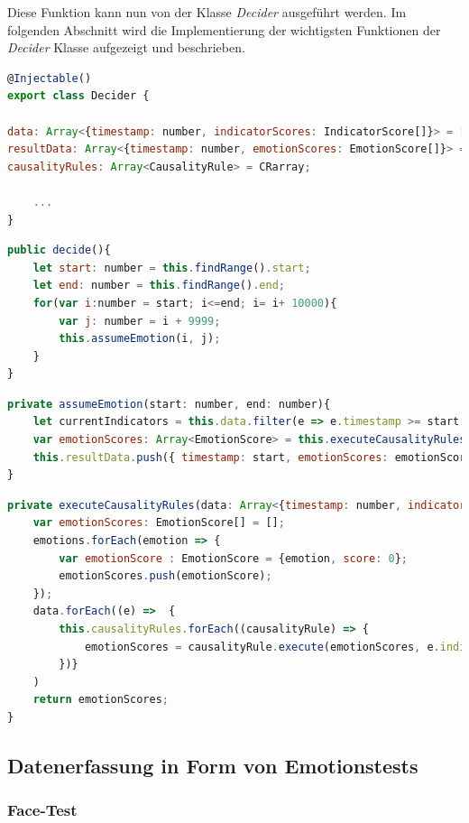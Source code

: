 Diese Funktion kann nun von der Klasse \textit{Decider} ausgeführt werden.
\newline \newline
Im folgenden Abschnitt wird die Implementierung der wichtigsten Funktionen der \textit{Decider} Klasse aufgezeigt und beschrieben. \newpage
\begin{lstlisting}[caption={Atrribute der Decider-Klasse}, language=JavaScript]
@Injectable()
export class Decider {

data: Array<{timestamp: number, indicatorScores: IndicatorScore[]}> = [];
resultData: Array<{timestamp: number, emotionScores: EmotionScore[]}> = [];
causalityRules: Array<CausalityRule> = CRarray;

	...
}
\end{lstlisting}
\begin{lstlisting}[caption={decide-Funktion der Decider-Klasse}, language=JavaScript]
public decide(){
	let start: number = this.findRange().start;
	let end: number = this.findRange().end;
	for(var i:number = start; i<=end; i= i+ 10000){
		var j: number = i + 9999;
		this.assumeEmotion(i, j);
	} 
}
\end{lstlisting}
\begin{lstlisting}[caption={assumeEmotion-Funktion der Decider-Klasse}, language=JavaScript]
private assumeEmotion(start: number, end: number){
	let currentIndicators = this.data.filter(e => e.timestamp >= start && e.timestamp <= end)
	var emotionScores: Array<EmotionScore> = this.executeCausalityRules(currentIndicators);
	this.resultData.push({ timestamp: start, emotionScores: emotionScores});
}
\end{lstlisting}
\begin{lstlisting}[caption={executeCausalityRules-Funktion der Decider-Klasse}, language=JavaScript]
private executeCausalityRules(data: Array<{timestamp: number, indicatorScores: IndicatorScore[]}>){   
	var emotionScores: EmotionScore[] = [];
	emotions.forEach(emotion => {
		var emotionScore : EmotionScore = {emotion, score: 0};
		emotionScores.push(emotionScore);
	});
	data.forEach((e) =>  { 
		this.causalityRules.forEach((causalityRule) => {
			emotionScores = causalityRule.execute(emotionScores, e.indicatorScores)  ;
		})}
	)
	return emotionScores;
}
\end{lstlisting}
\subsection{Datenerfassung in Form von Emotionstests}
\subsubsection{Face-Test}
